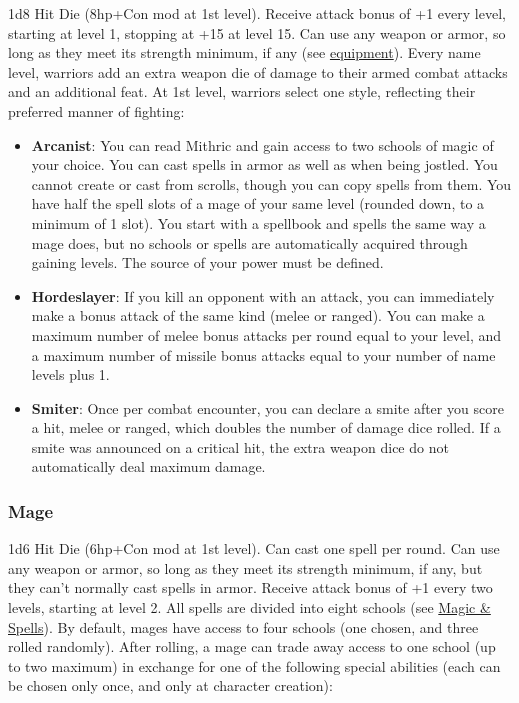\documentclass{article}
\begin{document}
\begin{multicols}{2}
1d8 Hit Die (8hp+Con mod at 1st level). Receive attack bonus of +1 every
level, starting at level 1, stopping at +15 at level 15. Can use any
weapon or armor, so long as they meet its strength minimum, if any (see
\hyperref[armor-weapons-and-equipment]{equipment}). Every name level,
warriors add an extra weapon die of damage to their armed combat attacks
and an additional feat. At 1st level, warriors select one style,
reflecting their preferred manner of fighting:

\begin{itemize}
\tightlist
\item
  \textbf{Arcanist}: You can read Mithric and gain access to two schools
  of magic of your choice. You can cast spells in armor as well as when
  being jostled. You cannot create or cast from scrolls, though you can
  copy spells from them. You have half the spell slots of a mage of your
  same level (rounded down, to a minimum of 1 slot). You start with a
  spellbook and spells the same way a mage does, but no schools or
  spells are automatically acquired through gaining levels. The source
  of your power must be defined.
\item
  \textbf{Hordeslayer}: If you kill an opponent with an attack, you can
  immediately make a bonus attack of the same kind (melee or ranged).
  You can make a maximum number of melee bonus attacks per round equal
  to your level, and a maximum number of missile bonus attacks equal to
  your number of name levels plus 1.
\item
  \textbf{Smiter}: Once per combat encounter, you can declare a smite
  after you score a hit, melee or ranged, which doubles the number of
  damage dice rolled. If a smite was announced on a critical hit, the
  extra weapon dice do not automatically deal maximum damage.
\end{itemize}

\subsubsection{Mage}\label{mage}

1d6 Hit Die (6hp+Con mod at 1st level). Can cast one spell per round.
Can use any weapon or armor, so long as they meet its strength minimum,
if any, but they can't normally cast spells in armor. Receive attack
bonus of +1 every two levels, starting at level 2. All spells are
divided into eight schools (see \hyperref[magic-spells]{Magic \&
Spells}). By default, mages have access to four schools (one chosen, and
three rolled randomly). After rolling, a mage can trade away access to
one school (up to two maximum) in exchange for one of the following
special abilities (each can be chosen only once, and only at character
creation):


\end{multicols}
\end{document}
